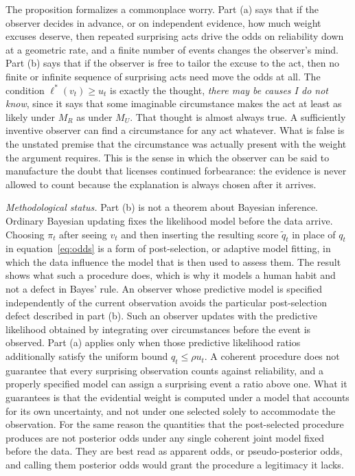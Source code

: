 \documentclass[11pt]{article}
\theoremstyle{definition}
\theoremstyle{remark}
\begin{document}
The proposition formalizes a commonplace worry. Part (a) says that if the observer decides in advance, or on independent evidence, how much weight excuses deserve, then repeated surprising acts drive the odds on reliability down at a geometric rate, and a finite number of events changes the observer's mind. Part (b) says that if the observer is free to tailor the excuse to the act, then no finite or infinite sequence of surprising acts need move the odds at all. The condition $\ell^{*}(v_t)\ge u_t$ is exactly the thought, \emph{there may be causes I do not know}, since it says that some imaginable circumstance makes the act at least as likely under $M_R$ as under $M_U$. That thought is almost always true. A sufficiently inventive observer can find a circumstance for any act whatever. What is false is the unstated premise that the circumstance was actually present with the weight the argument requires. This is the sense in which the observer can be said to manufacture the doubt that licenses continued forbearance: the evidence is never allowed to count because the explanation is always chosen after it arrives.

\emph{Methodological status.} Part (b) is not a theorem about Bayesian inference. Ordinary Bayesian updating fixes the likelihood model before the data arrive. Choosing $\pi_t$ after seeing $v_t$ and then inserting the resulting score $\tilde q_t$ in place of $q_t$ in equation~\eqref{eq:odds} is a form of post-selection, or adaptive model fitting, in which the data influence the model that is then used to assess them. The result shows what such a procedure does, which is why it models a human habit and not a defect in Bayes' rule. An observer whose predictive model is specified independently of the current observation avoids the particular post-selection defect described in part (b). Such an observer updates with the predictive likelihood obtained by integrating over circumstances before the event is observed. Part (a) applies only when those predictive likelihood ratios additionally satisfy the uniform bound $q_t\le\rho u_t$. A coherent procedure does not guarantee that every surprising observation counts against reliability, and a properly specified model can assign a surprising event a ratio above one. What it guarantees is that the evidential weight is computed under a model that accounts for its own uncertainty, and not under one selected solely to accommodate the observation. For the same reason the quantities that the post-selected procedure produces are not posterior odds under any single coherent joint model fixed before the data. They are best read as apparent odds, or pseudo-posterior odds, and calling them posterior odds would grant the procedure a legitimacy it lacks.
\end{document}
